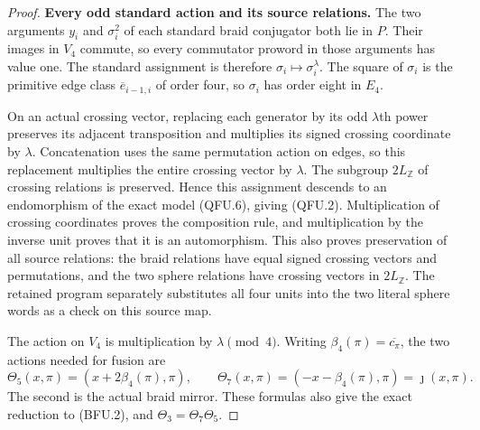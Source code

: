 \begin{proof}
\par\medskip\noindent\textbf{Every odd standard action and its source relations.}\quad
The two arguments $y_i$ and $\sigma_i^2$ of each standard
braid conjugator both lie in $P$.  Their images in $V_4$
commute, so every commutator proword in those arguments
has value one.  The standard assignment is therefore
$\sigma_i\mapsto\sigma_i^\lambda$.
The square of $\sigma_i$ is the primitive edge class
$\overline e_{i-1,i}$ of order four, so $\sigma_i$
has order eight in $E_4$.

On an actual crossing vector, replacing each generator
by its odd $\lambda$th power preserves its adjacent
transposition and multiplies its signed crossing coordinate
by $\lambda$.  Concatenation uses the same permutation
action on edges, so this replacement multiplies the entire
crossing vector by $\lambda$.  The subgroup $2L_{\mathbb Z}$
of crossing relations is preserved.  Hence this assignment
descends to an endomorphism of the exact model (QFU.6),
giving (QFU.2).  Multiplication of crossing coordinates
proves the composition rule, and multiplication by the
inverse unit proves that it is an automorphism.
This also proves preservation of all source relations:
the braid relations have equal signed crossing vectors
and permutations, and the two sphere relations have
crossing vectors in $2L_{\mathbb Z}$.  The retained
program separately substitutes all four units into the
two literal sphere words as a check on this source map.

The action on $V_4$ is multiplication by $\lambda\pmod4$.
Writing $\beta_4(\pi)=\overline{c_\pi}$, the two
actions needed for fusion are
\[
 \Theta_5(x,\pi)=(x+2\beta_4(\pi),\pi),\qquad
 \Theta_7(x,\pi)=(-x-\beta_4(\pi),\pi)=\jmath(x,\pi).
                                                               \tag{QFU.7}
\]
The second is the actual braid mirror.  These formulas
also give the exact reduction to (BFU.2), and
$\Theta_3=\Theta_7\Theta_5$.


\end{proof}
